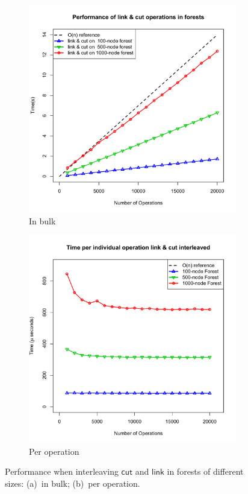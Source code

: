 \documentclass{elsarticle}
\newcommand{\MATHSF}[1]{\ensuremath{\mathsf{#1}}\xspace}
\newcommand{\link}{\MATHSF{link}}
\newcommand{\cut}{\MATHSF{cut}}
\begin{document}
\begin{figure}[H]
\centering
\begin{subfigure}{.5\textwidth}
  \centering
  \includegraphics[scale=0.38]{./Images/plotForests}
  \caption{In bulk}
\end{subfigure}%
\begin{subfigure}{.5\textwidth}
  \centering
  \includegraphics[scale=0.38]{./Images/plotLCForests}
  \caption{Per operation}
\end{subfigure}
\caption{Performance when interleaving \cut and \link in forests of different sizes: (a)~in bulk; (b)~per operation.}
\label{fig:EachOpForest}
\end{figure}
\end{document}
